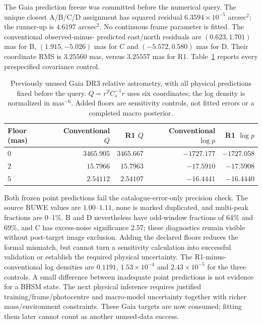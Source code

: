 The Gaia prediction freeze was committed before the numerical query.
The unique closest A/B/C/D assignment has squared residual
$6.3594\times10^{-5}$ arcsec$^2$; the runner-up is $4.6197$ arcsec$^2$.
No continuous frame parameter is fitted. The conventional observed-minus-
predicted east/north residuals are $(0.623,1.701)$ mas for B,
$(1.915,-5.026)$ mas for C and $(-5.572,0.580)$ mas for D.
Their coordinate RMS is $3.25560$ mas, versus $3.25557$ mas for R1.
Table~\ref{tab:gaia-frozen} reports every prespecified covariance control.

\begin{table}[htbp]
 \centering
 \caption{Previously unused Gaia DR3 relative astrometry, with all physical
 predictions fixed before the query. $Q=r^TC_s^{-1}r$ uses six coordinates;
 the log density is normalized in mas$^{-6}$. Added floors are sensitivity
 controls, not fitted errors or a completed macro posterior.}
 \label{tab:gaia-frozen}
 \begin{tabular}{lrrrr}
 \toprule
 Floor (mas) & Conventional $Q$ & R1 $Q$ & Conventional $\log p$ & R1 $\log p$\\
 \midrule
 $0$ & $3465.905$ & $3465.667$ & $-1727.177$ & $-1727.058$\\
 $2$ & $15.7966$ & $15.7963$ & $-17.5910$ & $-17.5908$\\
 $5$ & $2.54112$ & $2.54107$ & $-16.4441$ & $-16.4440$\\
 \bottomrule
 \end{tabular}
\end{table}

Both frozen point predictions fail the catalogue-error-only precision
check. The source RUWE values are $1.00$--$1.11$, none is marked duplicated,
and multi-peak fractions are 0--1\%. B and D nevertheless have odd-window
fractions of 64\% and 69\%, and C has excess-noise significance 2.57;
these diagnostics remain visible without post-target image exclusion.
Adding the declared floors reduces the
formal mismatch, but cannot turn a sensitivity calculation into successful
validation or establish the required physical uncertainty. The R1-minus-
conventional log densities are $0.1191$, $1.53\times10^{-4}$ and
$2.43\times10^{-5}$ for the three controls. A small difference between
inadequate point predictions is not evidence for a BHSM state.
The next physical inference requires justified training/frame/photocentre
and macro-model uncertainty together with richer mass/environment
constraints. These Gaia targets are now consumed; fitting them later
cannot count as another unused-data success.
